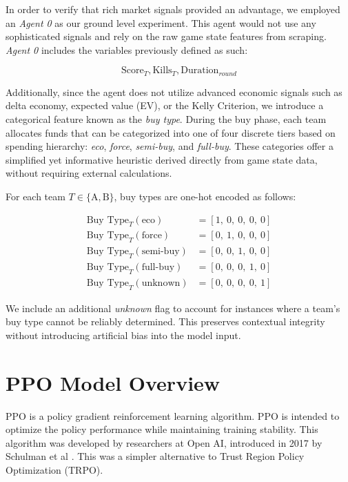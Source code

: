 \documentclass[sigconf]{acmart}
\begin{document}
In order to verify that rich market signals provided an advantage, we employed an \textit{Agent 0} as our ground level experiment. This agent would not use any sophisticated signals and rely on the raw game state features from scraping. \textit{Agent 0} includes the variables previously defined as such:

\begin{equation}
  \text{Score}_{T},
  \text{Kills}_{T},
  \text{Duration}_{round}
\end{equation}

Additionally, since the agent does not utilize advanced economic signals such as delta economy, expected value (EV), or the Kelly Criterion, we introduce a categorical feature known as the \textit{buy type}. During the buy phase, each team allocates funds that can be categorized into one of four discrete tiers based on spending hierarchy: \textit{eco}, \textit{force}, \textit{semi-buy}, and \textit{full-buy}. These categories offer a simplified yet informative heuristic derived directly from game state data, without requiring external calculations.

For each team \( T \in \{\text{A}, \text{B}\} \), buy types are one-hot encoded as follows:

\begin{align}
\text{Buy Type}_T(\text{eco})      &= [1,\ 0,\ 0,\ 0,\ 0] \nonumber \\
\text{Buy Type}_T(\text{force})    &= [0,\ 1,\ 0,\ 0,\ 0] \nonumber \\
\text{Buy Type}_T(\text{semi-buy}) &= [0,\ 0,\ 1,\ 0,\ 0] \nonumber \\
\text{Buy Type}_T(\text{full-buy}) &= [0,\ 0,\ 0,\ 1,\ 0] \nonumber \\
\text{Buy Type}_T(\text{unknown})  &= [0,\ 0,\ 0,\ 0,\ 1]
\end{align}

We include an additional \textit{unknown} flag to account for instances where a team’s buy type cannot be reliably determined. This preserves contextual integrity without introducing artificial bias into the model input.

\section{PPO Model Overview}

PPO is a policy gradient reinforcement learning algorithm. PPO is intended to optimize the policy performance while maintaining training stability. This algorithm was developed by researchers at Open AI, introduced in 2017 by Schulman et al \cite{schulman2017proximalpolicyoptimizationalgorithms}. This was a simpler alternative to Trust Region Policy Optimization (TRPO).
\end{document}
